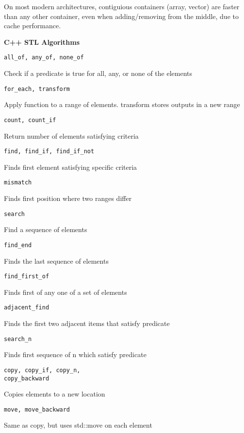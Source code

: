 On most modern architectures, contiguious containers (array, vector) are faster
than any other container, even when adding/removing from the middle, due to
cache performance.

\begin{center}
\textbf{C++ STL Algorithms}
\end{center}
\begin{multicols}{2}

\begin{lstlisting}
all_of, any_of, none_of
\end{lstlisting}
Check if a predicate is true for all, any, or none of the elements
\begin{lstlisting}
for_each, transform
\end{lstlisting}
Apply function to a range of elements.  transform stores outputs in a new range
\begin{lstlisting}
count, count_if
\end{lstlisting}
Return number of elements satisfying criteria
\begin{lstlisting}
find, find_if, find_if_not
\end{lstlisting}
Finds first element satisfying specific criteria
\begin{lstlisting}
mismatch
\end{lstlisting}
Finds first position where two ranges differ
\begin{lstlisting}
search
\end{lstlisting}
Find a sequence of elements
\begin{lstlisting}
find_end
\end{lstlisting}
Finds the last sequence of elements
\begin{lstlisting}
find_first_of
\end{lstlisting}
Finds first of any one of a set of elements
\begin{lstlisting}
adjacent_find
\end{lstlisting}
Finds the first two adjacent items that satisfy predicate
\begin{lstlisting}
search_n
\end{lstlisting}
Finds first sequence of n which satisfy predicate
\begin{lstlisting}
copy, copy_if, copy_n,
copy_backward
\end{lstlisting}
Copies elements to a new location
\begin{lstlisting}
move, move_backward
\end{lstlisting}
Same as copy, but uses std::move on each element

\end{multicols}
